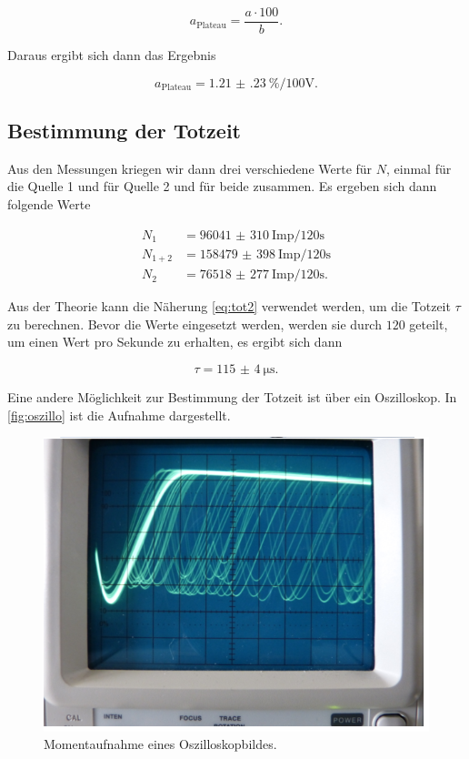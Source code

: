 \begin{equation}
    a_\text{Plateau} = \frac{a \cdot 100 }{b}.
\end{equation}

Daraus ergibt sich dann das Ergebnis 

\begin{equation}
    a_\text{Plateau} = \SI{1.21(23)}{\%\per100\volt}.
\end{equation}

\subsection{Bestimmung der Totzeit}
\label{ssec:a2}

Aus den Messungen kriegen wir dann drei verschiedene Werte für $N$, einmal für die Quelle 1 und für Quelle 2 und für beide zusammen.
Es ergeben sich dann folgende Werte

\begin{align}
    N_1 &= \SI{96041(310)}{\text{Imp}\per120\second}\\
    N_{1+2} &= \SI{158479(398)}{\text{Imp}\per120\second}\\
    N_2 &= \SI{76518(277)}{\text{Imp}\per120\second}.
\end{align}

Aus der Theorie kann die Näherung \eqref{eq:tot2} verwendet werden, um die Totzeit $\tau$ zu berechnen.
Bevor die Werte eingesetzt werden, werden sie durch $120$ geteilt, um einen Wert pro Sekunde zu erhalten, es ergibt sich dann 

\begin{equation}
    \tau = \SI{115(4)}{\micro\second}.
\end{equation}

Eine andere Möglichkeit zur Bestimmung der Totzeit ist über ein Oszilloskop.
In \autoref{fig:oszillo} ist die Aufnahme dargestellt.

\begin{figure}
    \centering
    \includegraphics[width=\textwidth]{images/bild5.png}
    \caption{Momentaufnahme eines Oszilloskopbildes.}
    \label{fig:oszillo}
\end{figure}

